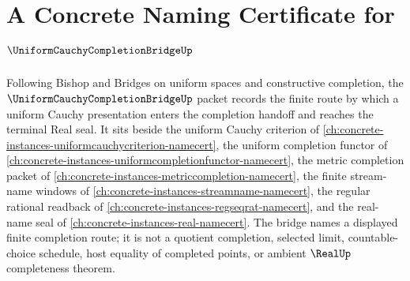 \chapter{A Concrete Naming Certificate for $\UniformCauchyCompletionBridgeUp$}
\label{ch:concrete-instances-uniform-cauchy-completion-bridge-namecert}

Following Bishop and Bridges on uniform spaces and constructive completion, the $\UniformCauchyCompletionBridgeUp$ packet records the finite route by which a uniform Cauchy presentation enters the completion handoff and reaches the terminal Real seal. It sits beside the uniform Cauchy criterion of \autoref{ch:concrete-instances-uniformcauchycriterion-namecert}, the uniform completion functor of \autoref{ch:concrete-instances-uniformcompletionfunctor-namecert}, the metric completion packet of \autoref{ch:concrete-instances-metriccompletion-namecert}, the finite stream-name windows of \autoref{ch:concrete-instances-streamname-namecert}, the regular rational readback of \autoref{ch:concrete-instances-regseqrat-namecert}, and the real-name seal of \autoref{ch:concrete-instances-real-namecert}. The bridge names a displayed finite completion route; it is not a quotient completion, selected limit, countable-choice schedule, host equality of completed points, or ambient $\RealUp$ completeness theorem.

